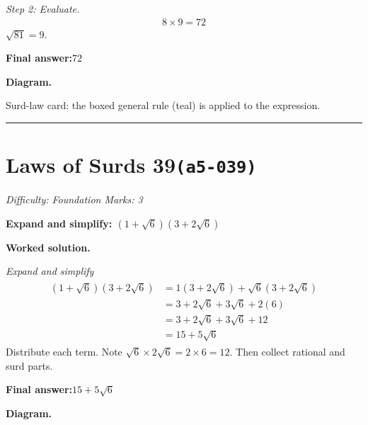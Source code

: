 \documentclass[11pt]{article}
\newcommand{\question}[1]{\par\medskip\noindent\textbf{#1}\par}
\begin{document}
\textit{Step 2: Evaluate.}
\[\begin{gathered}
8 \times 9 = 72
\end{gathered}\]
\( \sqrt{81} = 9 \).

\begin{answerbox}
\textbf{Final answer:}\quad \(\displaystyle 72\)
\end{answerbox}
\textbf{Diagram.}

\begin{center}
\end{center}
\small Surd-law card: the boxed general rule (teal) is applied to the expression.\normalsize

\medskip\hrule

\section*{Laws of Surds 39\quad\small\texttt{(a5-039)}}
\textit{Difficulty: Foundation \quad\textbar\quad Marks: 3}

\question{Expand and simplify: \( (1 + \sqrt{6})(3 + 2\sqrt{6}) \)}

\textbf{Worked solution.}

\textit{Expand and simplify}
\[\begin{gathered}
\begin{aligned} (1+\sqrt{6})(3+2\sqrt{6}) &= 1(3+2\sqrt{6})+\sqrt{6}(3+2\sqrt{6}) \\ &= 3+2\sqrt{6}+3\sqrt{6}+2(6) \\ &= 3+2\sqrt{6}+3\sqrt{6}+12 \\ &= 15 + 5\sqrt{6} \end{aligned}
\end{gathered}\]
Distribute each term. Note \(\sqrt{6} \times 2\sqrt{6} = 2 \times 6 = 12\). Then collect rational and surd parts.

\begin{answerbox}
\textbf{Final answer:}\quad \(\displaystyle 15 + 5\sqrt{6}\)
\end{answerbox}
\textbf{Diagram.}
\end{document}
